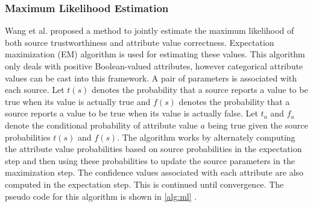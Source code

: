 \documentclass{acm_proc_article-sp}
\begin{document}
\subsubsection{Maximum Likelihood Estimation}
Wang et al. \cite{wang2012truth} proposed a  method to jointly estimate the maximum likelihood of both source trustworthiness and attribute value correctness. Expectation maximization (EM) algorithm is used for estimating these values.  This algorithm only deals with positive Boolean-valued attributes, however categorical attribute values can be cast into this framework. A pair of parameters is associated with each source. Let $t(s)$ denotes the probability that a source reports a value to be true when its value is actually true and $f(s)$ denotes the probability that a source reports a value to be true when its value is actually false.  Let ${t_a}$ and ${f_a}$ denote the conditional probability of attribute value $a$ being true given the source probabilities $t(s)$ and $f(s)$.  The algorithm works by alternately computing the attribute value probabilities based on source probabilities in the expectation step and then using these probabilities to update the source parameters in the maximization step.  The confidence values associated with each attribute are also computed in the expectation step. This is continued until convergence.  The pseudo code for this algorithm is shown in \ref{alg:ml} .
\end{document}
